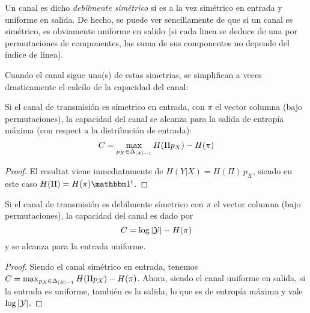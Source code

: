 {\begin{definicion}
Un canal  es dicho {\em  debilmente sim\'etrico} si es  a la vez  sim\'etrico en
entrada y uniforme en salida. De hecho,  se puede ver sencillamente de que si un
canal es sim\'etrico, es obviamente uniforme  en salido (si cada linea se deduce
de una por permutaciones de componentes,  las suma de sus componentes no depende
del \'indice de linea).

\end{definicion}

Cuando  el  canal sigue  una(s)  de  estas  simetrias,  se simplifican  a  veces
drasticamente el calcilo de la capacidad del canal:

\begin{teorema}
Si el  canal de  transmisi\'on es  s\'imetrico en entrada,  con $\pi$  el vector
columna (bajo permutaciones),  la capacidad del canal se alcanza  para la salida
de entrop\'ia m\'axima (con respect a la distribuci\'on de entrada):
%
\[
C = \max_{p_X \in \Delta_{|\mathcal{X}|-1}} H(\Pi p_X) - H(\pi)
\]
\end{teorema}
\begin{proof}
El resultat viene  inmediatamente de $H(Y|X) = H(\Pi) \, p_X$,  siendo en este caso
$H(\Pi) = H(\pi) \uno^t$.
\end{proof}


\begin{teorema}
Si el  canal de  transmisi\'on es  debilmente s\'imetrico  con $\pi$  el vector
columna (bajo permutaciones),  la capacidad del canal es dado por
%
\[
C = \log |\mathcal{Y}| - H(\pi)
\]
%
y se alcanza  para la entrada uniforme.
\end{teorema}
\begin{proof}
Siendo     el      canal     sim\'etrico     en     entrada,      tenemos     $C
= \max_{p_X  \in \Delta_{|\mathcal{X}|-1}}  H(\Pi p_X)  - H(\pi)$.  Ahora, siendo  el canal
uniforme en salida, si la entrada es uniforme, tambi\'en es la salida, lo que es
de entrop\'ia m\'axima y vale $\log |\mathcal{Y}|$.
\end{proof}

}
